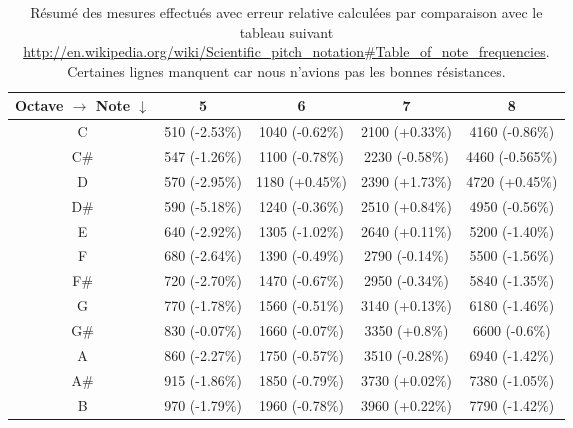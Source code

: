 \begin{table}[ht]
	\centering
		\begin{tabular}{|c|c|c|c|c|}
			\hline
				\specialcell{Octave $\rightarrow$ \\ Note $\downarrow$} & 5 & 6 & 7 & 8 \\
			\hline
				 C & \unit{510}{\milli\volt} (-2.53\%) & \unit{1040}{\milli\volt} (-0.62\%) & \unit{2100}{\milli\volt} (+0.33\%) & \unit{4160}{\milli\volt} (-0.86\%) \\
			\hline
				 C\# & \unit{547}{\milli\volt} (-1.26\%) & \unit{1100}{\milli\volt} (-0.78\%) & \unit{2230}{\milli\volt} (-0.58\%) & \unit{4460}{\milli\volt} (-0.565\%) \\
			\hline
				 D &  \unit{570}{\milli\volt} (-2.95\%) & \unit{1180}{\milli\volt} (+0.45\%) & \unit{2390}{\milli\volt} (+1.73\%) & \unit{4720}{\milli\volt} (+0.45\%) \\
			\hline
				 D\# & \unit{590}{\milli\volt} (-5.18\%) & \unit{1240}{\milli\volt} (-0.36\%) & \unit{2510}{\milli\volt} (+0.84\%) & \unit{4950}{\milli\volt} (-0.56\%) \\
			\hline
				 E & \unit{640}{\milli\volt} (-2.92\%) & \unit{1305}{\milli\volt} (-1.02\%) & \unit{2640}{\milli\volt} (+0.11\%) & \unit{5200}{\milli\volt} (-1.40\%) \\
			\hline
				 F & \unit{680}{\milli\volt} (-2.64\%) & \unit{1390}{\milli\volt} (-0.49\%) & \unit{2790}{\milli\volt} (-0.14\%) & \unit{5500}{\milli\volt} (-1.56\%) \\
			\hline
				 F\# & \unit{720}{\milli\volt} (-2.70\%) & \unit{1470}{\milli\volt} (-0.67\%) & \unit{2950}{\milli\volt} (-0.34\%) & \unit{5840}{\milli\volt} (-1.35\%) \\
			\hline
				 G & \unit{770}{\milli\volt} (-1.78\%) & \unit{1560}{\milli\volt} (-0.51\%) & \unit{3140}{\milli\volt} (+0.13\%) & \unit{6180}{\milli\volt} (-1.46\%) \\
			\hline
				 G\# & \unit{830}{\milli\volt} (-0.07\%)& \unit{1660}{\milli\volt} (-0.07\%) & \unit{3350}{\milli\volt} (+0.8\%) & \unit{6600}{\milli\volt} (-0.6\%) \\
			\hline
				 A & \unit{860}{\milli\volt} (-2.27\%) & \unit{1750}{\milli\volt} (-0.57\%) & \unit{3510}{\milli\volt} (-0.28\%) & \unit{6940}{\milli\volt} (-1.42\%) \\
			\hline
				 A\# & \unit{915}{\milli\volt} (-1.86\%) & \unit{1850}{\milli\volt} (-0.79\%) & \unit{3730}{\milli\volt} (+0.02\%) & \unit{7380}{\milli\volt} (-1.05\%) \\
			\hline
				 B & \unit{970}{\milli\volt} (-1.79\%) & \unit{1960}{\milli\volt} (-0.78\%) & \unit{3960}{\milli\volt} (+0.22\%) & \unit{7790}{\milli\volt} (-1.42\%) \\
			\hline
		\end{tabular}
	\caption{Résumé des mesures effectués avec erreur relative calculées par comparaison avec
	le tableau suivant \url{http://en.wikipedia.org/wiki/Scientific_pitch_notation\#Table_of_note_frequencies}. 
	Certaines lignes manquent car nous n'avions pas les bonnes résistances.}
	\label{tab:keyboard-measure-vs-theory}
\end{table}

